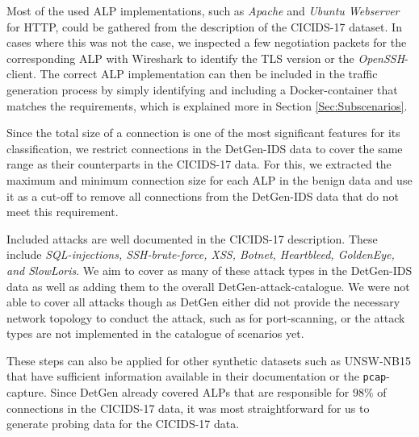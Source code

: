 \documentclass[runningheads]{llncs}
\begin{document}
Most of the used ALP implementations, such as \textit{Apache} and \textit{Ubuntu Webserver} for HTTP, could be gathered from the description of the CICIDS-17 dataset. In cases where this was not the case, we inspected a few negotiation packets for the corresponding ALP with Wireshark to identify the TLS version or the \textit{OpenSSH}-client. The correct ALP implementation can then be included in the traffic generation process by simply identifying and including a Docker-container that matches the requirements, which is explained more in Section \ref{Sec:Subscenarios}.

Since the total size of a connection is one of the most significant features for its classification, we restrict connections in the DetGen-IDS data to cover the same range as their counterparts in the CICIDS-17 data. For this, we extracted the maximum and minimum connection size for each ALP in the benign data and use it as a cut-off to remove all connections from the DetGen-IDS data that do not meet this requirement.

Included attacks are well documented in the CICIDS-17 description. These include \textit{SQL-injections, SSH-brute-force, XSS, Botnet, Heartbleed, GoldenEye, and SlowLoris}. We aim to cover as many of these attack types in the DetGen-IDS data as well as adding them to the overall DetGen-attack-catalogue. We were not able to cover all attacks though as DetGen either did not provide the necessary network topology to conduct the attack, such as for port-scanning, or the attack types are not implemented in the catalogue of scenarios yet. 

These steps can also be applied for other synthetic datasets such as UNSW-NB15 that have sufficient information available in their documentation or the \texttt{pcap}-capture. Since DetGen already covered ALPs that are responsible for $98\%$  of connections in the CICIDS-17 data, it was most straightforward for us to generate probing data for the CICIDS-17 data.
\end{document}
